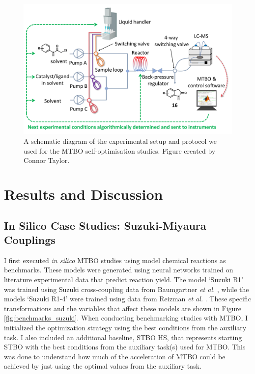 \begin{figure}
    \centering
    \includegraphics{gfx/Chapter04/self_optimization_setup.png}
    \caption{A schematic diagram of the experimental setup and protocol we used for the MTBO self-optimisation studies. Figure created by Connor Taylor.}
    \label{fig:self_opt_setup}
\end{figure}

\section{Results and Discussion}


\subsection{In Silico Case Studies: Suzuki-Miyaura Couplings}

I first executed \textit{in silico} MTBO studies using model chemical reactions as benchmarks. These models were generated using neural networks trained on literature experimental data that predict reaction yield. The model `Suzuki B1' was trained using Suzuki cross-coupling data from Baumgartner \textit{et al.} \cite{Baumgartner2018}, while the models `Suzuki R1-4' were trained using data from Reizman \textit{et al.} \cite{Reizman2016a}.  These specific transformations and the variables that affect these models are shown in Figure \ref{fig:benchmarks_suzuki}. When conducting benchmarking studies with MTBO, I initialized the optimization strategy using the best conditions from the auxiliary task.  I also included an additional baseline, STBO HS, that represents starting STBO with the best conditions from the auxiliary task(s) used for MTBO. This was done to understand how much of the acceleration of MTBO could be achieved by just using the optimal values from the auxiliary task.

